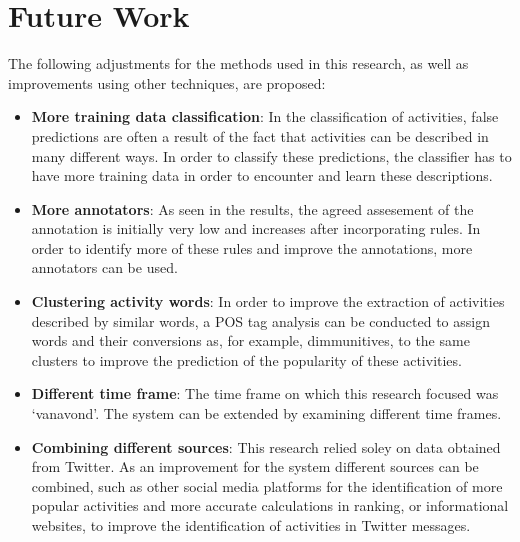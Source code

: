 \section{Future Work}\label{sec:fut}
The following adjustments for the methods used in this research, as well as improvements using other techniques, are proposed:
\begin{itemize}
\item \textbf{More training data classification}: In the classification of activities, false predictions are often a result of the fact that activities can be described in many different ways. In order to classify these predictions, the classifier has to have more training data in order to encounter and learn these descriptions.
\item \textbf{More annotators}: As seen in the results, the agreed assesement of the annotation is initially very low and increases after incorporating rules. In order to identify more of these rules and improve the annotations, more annotators can be used.
\item \textbf{Clustering activity words}: In order to improve the extraction of activities described by similar words, a POS tag analysis can be conducted to assign words and their conversions as, for example, dimmunitives, to the same clusters to improve the prediction of the popularity of these activities.
\item \textbf{Different time frame}: The time frame on which this research focused was `vanavond'. The system can be extended by examining different time frames.
\item \textbf{Combining different sources}: This research relied soley on data obtained from Twitter. As an improvement for the system different sources can be combined, such as other social media platforms for the identification of more popular activities and more accurate calculations in ranking, or informational websites, to improve the identification of activities in Twitter messages.
\end{itemize}
